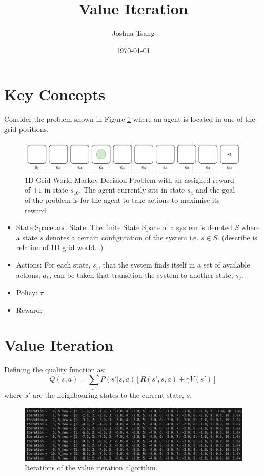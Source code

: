 \documentclass[a4paper,11pt]{article}
\title{Value Iteration}
\author{Joshua Tsang}
\date{\today}
\begin{document}
\maketitle
\tableofcontents

\section{Key Concepts}

Consider the problem shown in Figure \ref{fig:1d-grid-world-problem-statement} where an agent is located in one of the grid positions.

\begin{figure}
    \includegraphics[width=\textwidth]{images/1d-grid-world-problem-statement.png}
    \caption{1D Grid World Markov Decision Problem with an assigned reward of $+1$ in state $s_{10}$.  The agent currently sits in state $s_4$ and the goal of the problem is for the agent to take actions to maximise its reward.}
    \label{fig:1d-grid-world-problem-statement}
\end{figure}


\begin{itemize}
    \item State Space and State: The finite State Space of a system is denoted $S$ where a state $s$ denotes a certain configuration of the system i.e. $s \in S$.  (describe is relation of 1D grid world...)
    \item Actions: For each state, $s_i$, that the system finds itself in a set of available actions, ${a_k}$, can be taken that transition the system to another state, $s_j$.  
    \item Policy: $\pi$
    \item Reward: 
  \end{itemize}

\section{Value Iteration}

Defining the quality function as:
\begin{equation} \label{eqn:quality_function_Q}
    Q(s,a) = \sum_{s'} P(s'|s,a) \left[ R(s',s,a) + \gamma V(s') \right]
\end{equation}
where $s'$ are the neighbouring states to the current state, $s$.



\begin{figure}
    \includegraphics[width=\textwidth]{images/iters-of-value-iteration-1d-grid-world-code-output.png}
    \caption{Iterations of the value iteration algorithm.}
    \label{fig:iters-of-value-iteration-1d-grid-world-code-output}
\end{figure}
\end{document}
